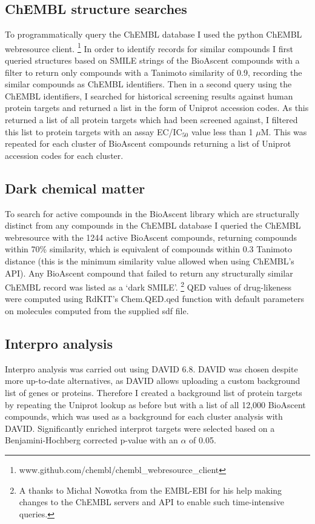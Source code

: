 \documentclass[a4paper,11pt,twoside,openright]{scrbook}
\begin{document}
\subsection{ChEMBL structure searches}
To programmatically query the ChEMBL database I used the python ChEMBL webresource client. \footnote{www.github.com/chembl/chembl\_webresource\_client}
In order to identify records for similar compounds I first queried structures based on SMILE strings of the BioAscent compounds with a filter to return only compounds with a Tanimoto similarity of 0.9, recording the similar compounds as ChEMBL identifiers.
Then in a second query using the ChEMBL identifiers, I searched for historical screening results against human protein targets and returned a list in the form of Uniprot accession codes.
As this returned a list of all protein targets which had been screened against, I filtered this list to protein targets with an assay EC/IC$_{50}$ value less than 1 $\mu$M.
This was repeated for each cluster of BioAscent compounds returning a list of Uniprot accession codes for each cluster.


\subsection{Dark chemical matter}
To search for active compounds in the BioAscent library which are structurally distinct from any compounds in the ChEMBL database I queried the ChEMBL webresource with the 1244 active BioAscent compounds, returning compounds within 70\% similarity, which is equivalent of compounds within 0.3 Tanimoto distance (this is the minimum similarity value allowed when using ChEMBL's API).
Any BioAscent compound that failed to return any structurally similar ChEMBL record was listed as a `dark SMILE'.
\footnote{A thanks to Michał Nowotka from the EMBL-EBI for his help making changes to the ChEMBL servers and API to enable such time-intensive queries.}
QED values of drug-likeness were computed using RdKIT's Chem.QED.qed function with default parameters on molecules computed from the supplied sdf file.


\subsection{Interpro analysis}
Interpro analysis was carried out using DAVID 6.8. \cite{Huang2009}
DAVID was chosen despite more up-to-date alternatives, as DAVID allows uploading a custom background list of genes or proteins.
Therefore I created a background list of protein targets by repeating the Uniprot lookup as before but with a list of all 12,000 BioAscent compounds, which was used as a background for each cluster analysis with DAVID.
Significantly enriched interprot targets were selected based on a Benjamini-Hochberg corrected p-value with an $\alpha$ of 0.05.



\end{document}
